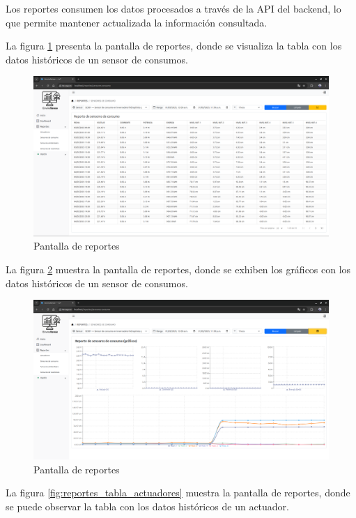 Los reportes consumen los datos procesados a través de la API del backend, lo
que permite mantener actualizada la información consultada.

La figura \ref{fig:reportes_tabla_consumos} presenta la pantalla de reportes,
donde se visualiza la tabla con los datos históricos de un sensor de consumos.

\begin{figure}[H]
    \centering
    \includegraphics[width=\textwidth]{./Images/28_reportes_1.png}
    \caption{Pantalla de reportes}
    \label{fig:reportes_tabla_consumos}
\end{figure}

La figura \ref{fig:reportes_graficos_consumos} muestra la pantalla de reportes,
donde se exhiben los gráficos con los datos históricos de un sensor de
consumos.

\begin{figure}[H]
    \centering
    \includegraphics[width=\textwidth]{./Images/28_reportes_2.png}
    \caption{Pantalla de reportes}
    \label{fig:reportes_graficos_consumos}
\end{figure}

La figura \ref{fig:reportes_tabla_actuadores} muestra la pantalla de reportes,
donde se puede observar la tabla con los datos históricos de un actuador.

